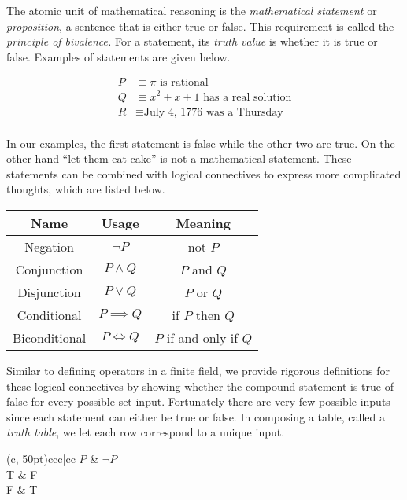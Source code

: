\documentclass[twoside]{report}
\begin{document}
The atomic unit of mathematical reasoning is the \emph{mathematical statement} or \emph{proposition},  a sentence that is either true or false. This requirement is called the \emph{principle of bivalence.} For a statement, its \emph{truth value} is whether it is true or false. Examples of statements are given below.

\begin{align*}
	P &\equiv \text{$\pi$ is rational} \\
	Q &\equiv \text{$x^2 + x + 1$ has a real solution} \\
	R &\equiv \text{July 4, 1776 was a Thursday} \\
\end{align*}
 
In our examples, the first statement is false while the other two are true. On the other hand ``let them eat cake'' is not a mathematical statement. These statements can be combined with logical connectives to express more complicated thoughts, which are listed below.

\vspace{\baselineskip}
\begin{center}
	\begin{tabular}{ccc}
		\toprule
		Name & Usage & Meaning \\
		\midrule
		Negation & $\neg P$ & not $P$ \\
		Conjunction & $P \wedge Q$ & $P$ and $Q$ \\
		Disjunction & $P \lor Q$ & $P$ or $Q$ \\
		Conditional & $P \implies Q$ & if $P$ then $Q$ \\
		Biconditional & $P \iff Q$ & $P$ if and only if $Q$ \\
		\bottomrule
	\end{tabular}
\end{center} 
\vspace{\baselineskip}

Similar to defining operators in a finite field, we provide rigorous definitions for these logical connectives by showing whether the compound statement is true of false for every possible set input. Fortunately there are very few possible inputs since each statement can either be true or false. In composing a table, called a \emph{truth table},  we let each row correspond to a unique input.

\vspace{\baselineskip}
\begin{center}
	\begin{TAB}(c, 50pt){cc}{c|cc}
		$P$ & $\neg P$ \\
		T & F \\
		F & T \\
	\end{TAB}
\end{center}
\vspace{\baselineskip}
\end{document}
